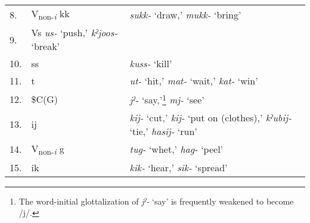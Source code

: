 \begin{table}
\begin{tabular}{lll}
8. & V\textsubscript{non-}\textit{\textsubscript{i}} kk&  \textit{sukk-} ‘draw,’ \textit{mukk-} ‘bring’                                                                                                                                                                                                       \\
9. & Vs  \textit{us-} ‘push,’ \textit{kˀjoos-} ‘break’ &                                                                                                                                                                                                                                                      \\
10.&  ss                                               &     \textit{kuss-} ‘kill’                                                                                                                                                                                                                            \\
11.&  t                                                &     \textit{ut-} ‘hit,’ \textit{mat-} ‘wait,’ \textit{kat-} ‘win’                                                                                                                                                                                    \\
12.&  \$C(G)                                           &     \textit{jˀ-} ‘say,’\footnote{The word-initial glottalization of \textit{jˀ-} ‘say’ is frequently weakened to become /j/.} \textit{mj-} ‘see’                                                                                                     \\
13.&  ij                                               &                             \textit{kij-} ‘cut,’ \textit{kij-} ‘put on (clothes),’ \textit{kˀubij-} ‘tie,’ \textit{hasij-} ‘run’                                                                                                                     \\
14.&  V\textsubscript{non-}\textit{\textsubscript{i}} g&  \textit{tug-} ‘whet,’ \textit{hag-} ‘peel’                                                                                                                                                                                                          \\
15.&  ik                                               &      \textit{kik-} ‘hear,’ \textit{sik-} ‘spread’                                                                                                                                                                                                    \\

\end{tabular}
\end{table}
